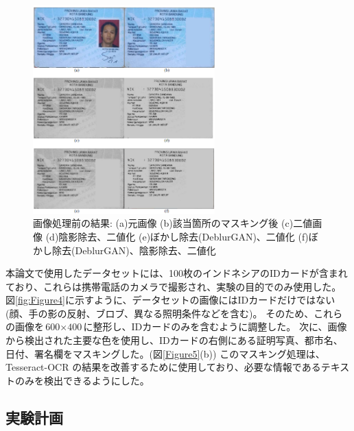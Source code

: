 \documentclass[uplatex, twocolumn,10pt]{jsarticle}
\begin{document}
\begin{figure}[t]
    \begin{center}
        \includegraphics*[width=7cm]{image/Figure5.png}
        \caption{画像処理前の結果: (a)元画像 (b)該当箇所のマスキング後 (c)二値画像 (d)陰影除去、二値化 (e)ぼかし除去(DeblurGAN)、二値化 (f)ぼかし除去(DeblurGAN)、陰影除去、二値化}
        \label{fig:Figure5}
    \end{center}
\end{figure}

本論文で使用したデータセットには、100枚のインドネシアのIDカードが含まれており、これらは携帯電話のカメラで撮影され、実験の目的でのみ使用した。
図\ref{fig:Figure4}に示すように、データセットの画像にはIDカードだけではない(顔、手の影の反射、ブロブ、異なる照明条件などを含む)。
そのため、これらの画像を$\text{600} \times \text{400}$に整形し、IDカードのみを含むように調整した。
次に、画像から検出された主要な色を使用し、IDカードの右側にある証明写真、都市名、日付、署名欄をマスキングした。(図\ref{Figure5}(b))
このマスキング処理は、Tesseract-OCR の結果を改善するために使用しており、必要な情報であるテキストのみを検出できるようにした。


\subsection{実験計画}
\end{document}
